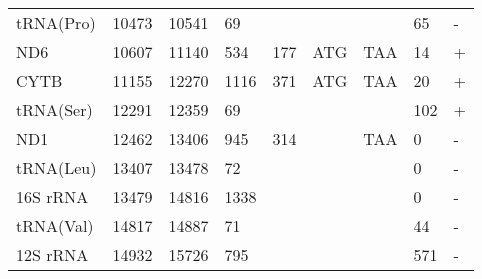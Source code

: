 \documentclass[../DISSERTACAO_MAIN.tex]{subfiles}
\begin{document}
\begin{longtable}{llllllllllllllllllllll}
			tRNA(Pro)    & 10473          & \multicolumn{2}{l}{10541} & \multicolumn{2}{l}{69}         & \multicolumn{3}{l}{}                          & \multicolumn{3}{l}{}              & \multicolumn{3}{l}{}      & \multicolumn{3}{l}{65}          & \multicolumn{4}{l}{-}                  \\
			ND6          & 10607          & \multicolumn{2}{l}{11140} & \multicolumn{2}{l}{534}        & \multicolumn{3}{l}{177}                       & \multicolumn{3}{l}{ATG}           & \multicolumn{3}{l}{TAA}   & \multicolumn{3}{l}{14}          & \multicolumn{4}{l}{+}                  \\
			CYTB         & 11155          & \multicolumn{2}{l}{12270} & \multicolumn{2}{l}{1116}       & \multicolumn{3}{l}{371}                       & \multicolumn{3}{l}{ATG}           & \multicolumn{3}{l}{TAA}   & \multicolumn{3}{l}{20}          & \multicolumn{4}{l}{+}                  \\
			tRNA(Ser)    & 12291          & \multicolumn{2}{l}{12359} & \multicolumn{2}{l}{69}         & \multicolumn{3}{l}{}                          & \multicolumn{3}{l}{}              & \multicolumn{3}{l}{}      & \multicolumn{3}{l}{102}         & \multicolumn{4}{l}{+}                  \\
			ND1          & 12462          & \multicolumn{2}{l}{13406} & \multicolumn{2}{l}{945}        & \multicolumn{3}{l}{314}                       & \multicolumn{3}{l}{}              & \multicolumn{3}{l}{TAA}   & \multicolumn{3}{l}{0}           & \multicolumn{4}{l}{-}                  \\
			tRNA(Leu)    & 13407          & \multicolumn{2}{l}{13478} & \multicolumn{2}{l}{72}         & \multicolumn{3}{l}{}                          & \multicolumn{3}{l}{}              & \multicolumn{3}{l}{}      & \multicolumn{3}{l}{0}           & \multicolumn{4}{l}{-}                  \\
			16S 				rRNA & 13479          & \multicolumn{2}{l}{14816} & \multicolumn{2}{l}{1338}       & \multicolumn{3}{l}{}                          & \multicolumn{3}{l}{}              & \multicolumn{3}{l}{}      & \multicolumn{3}{l}{0}           & \multicolumn{4}{l}{-}                  \\
			tRNA(Val)    & 14817          & \multicolumn{2}{l}{14887} & \multicolumn{2}{l}{71}         & \multicolumn{3}{l}{}                          & \multicolumn{3}{l}{}              & \multicolumn{3}{l}{}      & \multicolumn{3}{l}{44}          & \multicolumn{4}{l}{-}                  \\
			12S 				rRNA & 14932          & \multicolumn{2}{l}{15726} & \multicolumn{2}{l}{795}        & \multicolumn{3}{l}{}                          & \multicolumn{3}{l}{}              & \multicolumn{3}{l}{}      & \multicolumn{3}{l}{571}         & \multicolumn{4}{l}{-}                  \\

\end{longtable}
\end{document}
